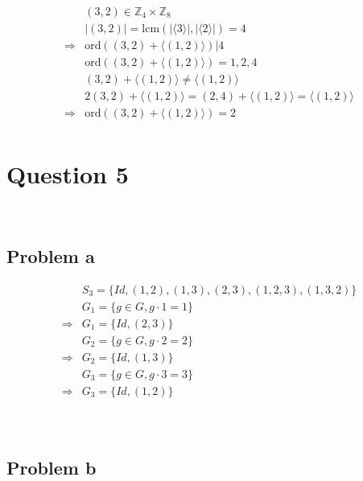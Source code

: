 \documentclass{article}
\begin{document}
~

\begin{equation*}
    \begin{split}
        &(3,2)\in\mathbb{Z} _4\times\mathbb{Z} _8\\
        &|(3,2)|=\text{lcm}(|\langle3\rangle|,|\langle2\rangle|)=4\\
        \Rightarrow&\text{ord}((3,2)+\langle(1,2)\rangle)|4\\
        &\text{ord}((3,2)+\langle(1,2)\rangle)=1,2,4\\
        &(3,2)+\langle(1,2)\rangle\ne\langle(1,2)\rangle\\
        &2(3,2)+\langle(1,2)\rangle=(2,4)+\langle(1,2)\rangle=\langle(1,2)\rangle\\
        \Rightarrow&\text{ord}((3,2)+\langle(1,2)\rangle)=2\\
    \end{split}
\end{equation*}

\newpage

\section*{Question 5}

~

\subsection*{Problem a}

\begin{equation*}
    \begin{split}
        &S_3=\{Id,(1,2),(1,3),(2,3),(1,2,3),(1,3,2)\}\\
        &G_1=\{g\in G,g\cdot1=1\}\\
        \Rightarrow&G_1=\{Id,(2,3)\}\\
        &G_2=\{g\in G,g\cdot2=2\}\\
        \Rightarrow&G_2=\{Id,(1,3)\}\\
        &G_3=\{g\in G,g\cdot3=3\}\\
        \Rightarrow&G_3=\{Id,(1,2)\}\\
    \end{split}
\end{equation*}

~

\subsection*{Problem b}
\end{document}
